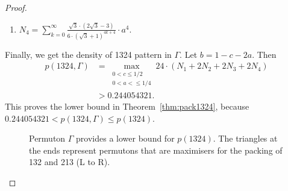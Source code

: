 \documentclass[12pt, a4paper, twoside]{report}
\begin{document}
\begin{proof}
\begin{enumerate}
\item $N_4 = \sum_{k=0}^\infty \frac{\sqrt{3}\cdot(2\sqrt{3}-3)}{6 \cdot (\sqrt{3}+1)^{4k+4}}\cdot a^4$.
\end{enumerate}
Finally, we get the density of 1324 pattern in $\Gamma$. Let $b = 1-c-2a$. Then
\begin{align*}
p(1324, \Gamma) &= \max_{\substack{0< c\leq 1/2\\ 0 < a < \leq 1/4}}24\cdot(N_1 + 2N_2 + 2N_3 + 2N_4)\\
& > 0.244054321.
\end{align*}
This proves the lower bound in Theorem~\ref{thm:pack1324}, because $0.244054321 < p(1324,\Gamma) \leq p(1324)$.
\begin{figure}[ht]
\centering
{}
\caption{\small{Permuton $\Gamma$ provides a lower bound for $p(1324)$. The triangles at the ends represent permutons that are maximisers for the packing of 132 and 213 (L to R).}}
\label{fig:gamma_constr}
\end{figure}


\end{proof}
\end{document}
